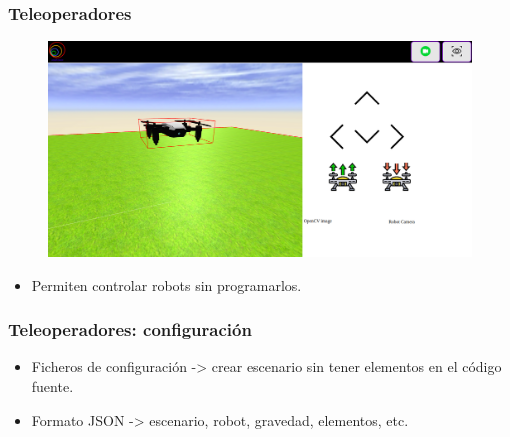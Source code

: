 \documentclass[xcolor={table}]{beamer}
\begin{document}
		\begin{frame}
		\frametitle{Teleoperadores}
    		\begin{figure}{\textwidth}
    		\centering
             \includegraphics[scale=0.18]{img/drone_teleoperator.png}
             \label{fig:teleopdrone}
            \end{figure}
            	\begin{itemize}
            	\begin{itemize}
    		    	\item Permiten controlar robots sin programarlos.
            	\end{itemize}
		    \end{itemize}
		\end{frame}
		
		\begin{frame}
			\frametitle{Teleoperadores: configuración}
			\newline
		    \begin{itemize}
		        \item Ficheros de configuración ->  crear escenario sin tener elementos en el código fuente.
		        \item Formato JSON ->  escenario,  robot, gravedad, elementos, etc. 
		    \end{itemize}
		\end{frame}
		
\end{document}
